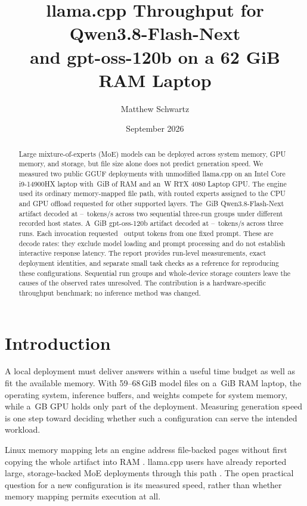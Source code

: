 \documentclass[11pt]{article}
\title{\textbf{llama.cpp Throughput for Qwen3.8-Flash-Next\\
and gpt-oss-120b on a 62 GiB RAM Laptop}}
\author{Matthew Schwartz\singleauthorinfo{Independent researcher \enspace
\href{https://orcid.org/0009-0009-4171-7247}{ORCID 0009-0009-4171-7247}
\enspace \texttt{matthew.schwartz.research@gmail.com}}}
\date{September 2026}
\begin{document}
\maketitle

\begin{abstract}
Large mixture-of-experts (MoE) models can be deployed across system memory,
GPU memory, and storage, but file size alone does not predict generation
speed. We measured two public GGUF deployments with unmodified llama.cpp on
an Intel Core i9-14900HX laptop with \PthreeCpuRamGiB\,GiB of RAM and an
\PthreeGpuPowerCapWatts\,W RTX 4080 Laptop GPU. The engine used its ordinary
memory-mapped file path, with routed experts assigned to the CPU and GPU
offload requested for other supported layers. The \PthreeFlashFileGiB\,GiB
Qwen3.8-Flash-Next artifact decoded at
\PthreeFlashInitialGenOne--\PthreeFlashQuietGenOne\ tokens/s across two
sequential three-run groups under different recorded host states. A
\PthreeGptOssFileGiB\,GiB gpt-oss-120b artifact decoded at
\PthreeGptOssInitialGenTwo--\PthreeGptOssInitialGenOne\ tokens/s across three
runs. Each invocation requested \PthreeGenerationRequestedDecode\ output
tokens from one fixed prompt. These are decode rates: they exclude model
loading and prompt processing and do not establish interactive response
latency. The report provides run-level measurements, exact deployment
identities, and separate small task checks as a reference for reproducing
these configurations. Sequential run groups and whole-device storage
counters leave the causes of the observed rates unresolved. The contribution
is a hardware-specific throughput benchmark; no inference method was changed.
\end{abstract}

\section{Introduction}

A local deployment must deliver answers within a useful time budget as well
as fit the available memory. With 59--68\,GiB model files on a
\PthreeCpuRamGiB\,GiB RAM laptop, the operating system, inference buffers,
and weights compete for system memory, while a
\PthreeGpuMarketedVramGB\,GB GPU holds only part of the deployment.
Measuring generation speed is one step toward deciding whether such a
configuration can serve the intended workload.

Linux memory mapping lets an engine address file-backed pages without first
copying the whole artifact into RAM \citep{linuxmmap2026,linuxmm2026}.
llama.cpp users have already reported large, storage-backed MoE deployments
through this path \citep{llamacppdiscussion18758,llamacppdiscussion23324}.
The open practical question for a new configuration is its measured speed,
rather than whether memory mapping permits execution at all.
\end{document}
